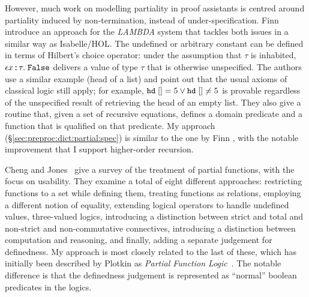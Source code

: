 However, much work on modelling partiality in proof assistants is centred around partiality induced by non-termination, instead of under-specification.
Finn \etal~\cite{finn1997partial} introduce an approach for the \emph{LAMBDA} system that tackles both issues in a similar way as Isabelle/HOL.
The undefined or arbitrary constant can be defined in terms of Hilbert's choice operator: under the assumption that $\tau$ is inhabited, $\epsilon x \mathbin{:\!\!:} \tau.\;\texttt{\textup{False}}$ delivers a value of type $\tau$ that is otherwise unspecified.
The authors use a similar example (head of a list) and point out that the usual axioms of classical logic still apply; for example, $\texttt{\textup{hd}}\;[] = 5 \vee \texttt{\textup{hd}}\;[] \neq 5$ is provable regardless of the unspecified result of retrieving the head of an empty list.
They also give a routine that, given a set of recursive equations, defines a domain predicate and a function that is qualified on that predicate.
My approach (§\ref{sec:preproc:dict:partial:spec}) is similar to the one by Finn \etal, with the notable improvement that I support higher-order recursion.

Cheng and Jones~\cite{cheng1991usability} give a survey of the treatment of partial functions, with the focus on usability.
They examine a total of eight different approaches:
restricting functions to a set while defining them,
treating functions as relations,
employing a different notion of equality,
extending logical operators to handle undefined values,
three-valued logics,
introducing a distinction between strict and total and non-strict and non-commutative connectives,
introducing a distinction between computation and reasoning, and finally,
adding a separate judgement for definedness.
My approach is most closely related to the last of these, which has initially been described by Plotkin as \emph{Partial Function Logic}~\cite[§9]{cheng1991usability}.
The notable difference is that the definedness judgement is represented as ``normal'' boolean predicates in the logics.